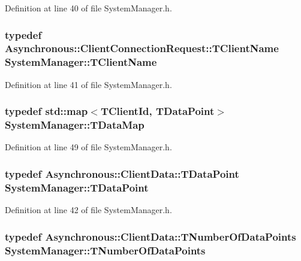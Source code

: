 Definition at line 40 of file System\-Manager.\-h.

\hypertarget{class_system_manager_a2d2818eaeb5787ef4f4d009ff343d195}{
\subsubsection[{T\-Client\-Name}]{\setlength{\rightskip}{0pt plus 5cm}typedef {\bf Asynchronous\-::\-Client\-Connection\-Request\-::\-T\-Client\-Name} {\bf System\-Manager\-::\-T\-Client\-Name}}}\label{class_system_manager_a2d2818eaeb5787ef4f4d009ff343d195}


Definition at line 41 of file System\-Manager.\-h.

\hypertarget{class_system_manager_ac003793cd03c1af317bf30b11e8c0a5a}{
\subsubsection[{T\-Data\-Map}]{\setlength{\rightskip}{0pt plus 5cm}typedef std\-::map$<${\bf T\-Client\-Id}, {\bf T\-Data\-Point}$>$ {\bf System\-Manager\-::\-T\-Data\-Map}\hspace{0.3cm}{\ttfamily [private]}}}\label{class_system_manager_ac003793cd03c1af317bf30b11e8c0a5a}


Definition at line 49 of file System\-Manager.\-h.

\hypertarget{class_system_manager_a177b09f79bd2cef44160fb4d8ea77996}{
\subsubsection[{T\-Data\-Point}]{\setlength{\rightskip}{0pt plus 5cm}typedef {\bf Asynchronous\-::\-Client\-Data\-::\-T\-Data\-Point} {\bf System\-Manager\-::\-T\-Data\-Point}}}\label{class_system_manager_a177b09f79bd2cef44160fb4d8ea77996}


Definition at line 42 of file System\-Manager.\-h.

\hypertarget{class_system_manager_a9cb6753ad6cd26b6ad46c194f38bee77}{
\subsubsection[{T\-Number\-Of\-Data\-Points}]{\setlength{\rightskip}{0pt plus 5cm}typedef {\bf Asynchronous\-::\-Client\-Data\-::\-T\-Number\-Of\-Data\-Points} {\bf System\-Manager\-::\-T\-Number\-Of\-Data\-Points}}}\label{class_system_manager_a9cb6753ad6cd26b6ad46c194f38bee77}


